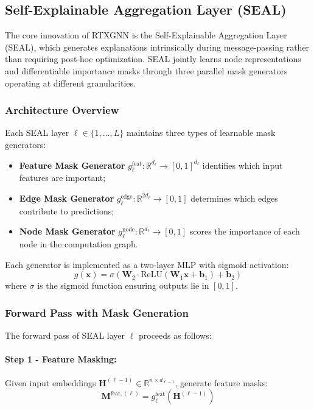 \subsection{Self-Explainable Aggregation Layer (SEAL)}
\label{subsec:seal}

The core innovation of RTXGNN is the Self-Explainable Aggregation Layer (SEAL), which generates explanations intrinsically during message-passing rather than requiring post-hoc optimization. SEAL jointly learns node representations and differentiable importance masks through three parallel mask generators operating at different granularities.

\subsubsection{Architecture Overview}

Each SEAL layer $\ell \in \{1, \ldots, L\}$ maintains three types of learnable mask generators:

\begin{itemize}
    \item \textbf{Feature Mask Generator} $g^{\text{feat}}_\ell: \mathbb{R}^{d_\ell} \to [0,1]^{d_\ell}$ identifies which input features are important;
    \item \textbf{Edge Mask Generator} $g^{\text{edge}}_\ell: \mathbb{R}^{2d_\ell} \to [0,1]$ determines which edges contribute to predictions;
    \item \textbf{Node Mask Generator} $g^{\text{node}}_\ell: \mathbb{R}^{d_\ell} \to [0,1]$ scores the importance of each node in the computation graph.
\end{itemize}

Each generator is implemented as a two-layer MLP with sigmoid activation:
\begin{equation}
    g(\mathbf{x}) = \sigma(\mathbf{W}_2 \cdot \text{ReLU}(\mathbf{W}_1 \mathbf{x} + \mathbf{b}_1) + \mathbf{b}_2)
\end{equation}
where $\sigma$ is the sigmoid function ensuring outputs lie in $[0,1]$.

\subsubsection{Forward Pass with Mask Generation}

The forward pass of SEAL layer $\ell$ proceeds as follows:

\paragraph{Step 1 - Feature Masking:} Given input embeddings $\mathbf{H}^{(\ell-1)} \in \mathbb{R}^{n \times d_{\ell-1}}$, generate feature masks:
\begin{equation}
    \mathbf{M}^{\text{feat},(\ell)} = g^{\text{feat}}_\ell(\mathbf{H}^{(\ell-1)})
\end{equation}

